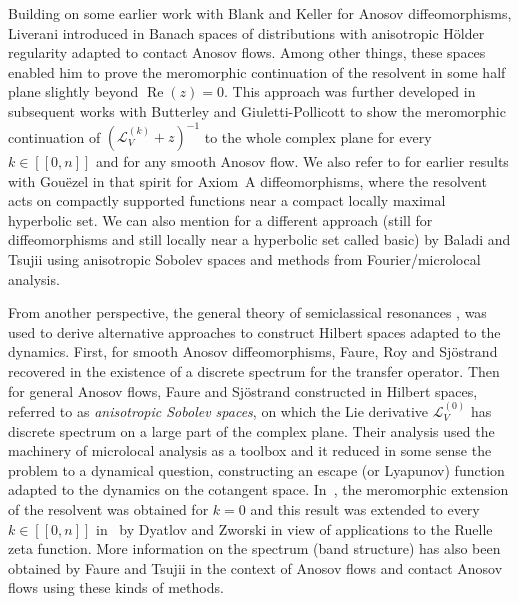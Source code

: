 \documentclass[JEP,XML,SOM,Unicode,NoEqCountersInSection,NoFloatCountersInSection,published]{cedram}
\newcommand{\lcr}{[\![}
\newcommand{\rcr}{]\!]}
\theoremstyle{definition}
\theoremstyle{plain}
\newcommand{\Lie}{\mathcal{L}}
\DeclareMathOperator{\re}{Re}
\begin{document}
Building on some earlier work \cite{BKL} with Blank and Keller for Anosov diffeomorphisms, Liverani introduced in \cite{liverani} Banach spaces of distributions with anisotropic Hölder regularity adapted to contact Anosov flows. Among other things, these spaces enabled him to prove the meromorphic continuation of the resolvent in some half plane slightly beyond $\re(z)=0$. This approach was further developed in subsequent works with Butterley \cite{butterley-liverani} and Giuletti-Pollicott \cite{GLP} to show the meromorphic continuation of $(\Lie_V^{(k)}+z)^{-1}$ to the whole complex plane for every $k\in\lcr0,n\rcr$ and for any smooth Anosov flow. We also refer to \cite{gouezel-liverani_2006, gouezel-liverani} for earlier results with Gouëzel in that spirit for Axiom~A diffeomorphisms, where the resolvent acts on compactly supported functions near a compact locally maximal hyperbolic set. We can also mention \cite{baladi-tsujii_2007} for a different approach (still for diffeomorphisms and still locally near a hyperbolic set called basic) by Baladi and Tsujii using anisotropic Sobolev spaces and methods from Fourier/microlocal analysis.

From another perspective, the general theory of semiclassical resonances \cite{DZ-book}, \cite{helffer-sjostrand} was used to derive alternative approaches to construct Hilbert spaces adapted to the dynamics. First, for smooth Anosov diffeomorphisms, Faure, Roy and Sjöstrand recovered in \cite{FRS} the existence of a discrete spectrum for the transfer operator. Then for general Anosov flows, Faure and Sjöstrand constructed in \cite{FS} Hilbert spaces, referred to as \textit{anisotropic Sobolev spaces}, on which the Lie derivative $\Lie_V^{(0)}$ has discrete spectrum on a large part of the complex plane. Their analysis used the machinery of microlocal analysis as a toolbox and it reduced in some sense the problem to a dynamical question, \ie constructing an escape (or Lyapunov) function adapted to the dynamics on the cotangent space. In~\cite{FS}, the meromorphic extension of the resolvent was obtained for $k = 0$ and this result was extended to every $k\in\lcr0,n\rcr$ in~\cite{dyatlov-zworski} by Dyatlov and Zworski in view of applications to the Ruelle zeta function. More information on the spectrum (\eg band structure) has also been obtained by Faure and Tsujii \cite{tsujii_2010,tsujii_2012, faure-tsujii2013,faure-tsujii2017,faure-tsujii2019,faure-tsujii2021} in the context of Anosov flows and contact Anosov flows using these kinds of methods.
\end{document}
